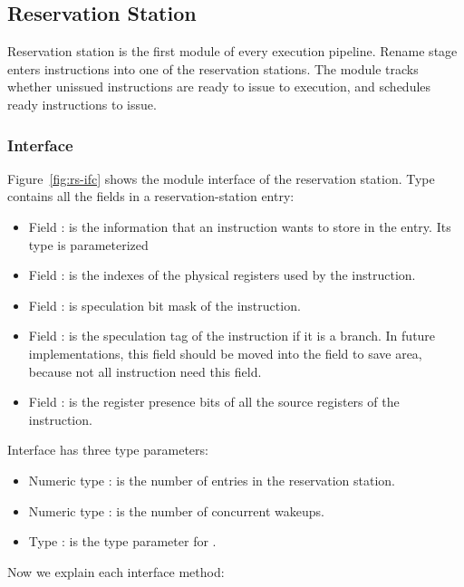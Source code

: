 \subsection{Reservation Station}\label{sec:rs}
Reservation station is the first module of every execution pipeline.
Rename stage enters instructions into one of the reservation stations.
The module tracks whether unissued instructions are ready to issue to execution, and schedules ready instructions to issue.

\subsubsection{Interface}\label{sec:rs:ifc}
Figure~\ref{fig:rs-ifc} shows the module interface of the reservation station.
Type  contains all the fields in a reservation-station entry:
\begin{itemize}
    \item Field : is the information that an instruction wants to store in the entry.
    Its type is parameterized
    \item Field : is the indexes of the physical registers used by the instruction.
    \item Field : is speculation bit mask of the instruction.
    \item Field : is the speculation tag of the instruction if it is a branch.
    In future implementations, this field should be moved into the  field to save area, because not all instruction need this field.
    \item Field : is the register presence bits of all the source registers of the instruction.
\end{itemize}
Interface  has three type parameters:
\begin{itemize}
    \item Numeric type : is the number of entries in the reservation station.
    \item Numeric type : is the number of concurrent wakeups.
    \item Type : is the type parameter for .
\end{itemize}
Now we explain each interface method:
